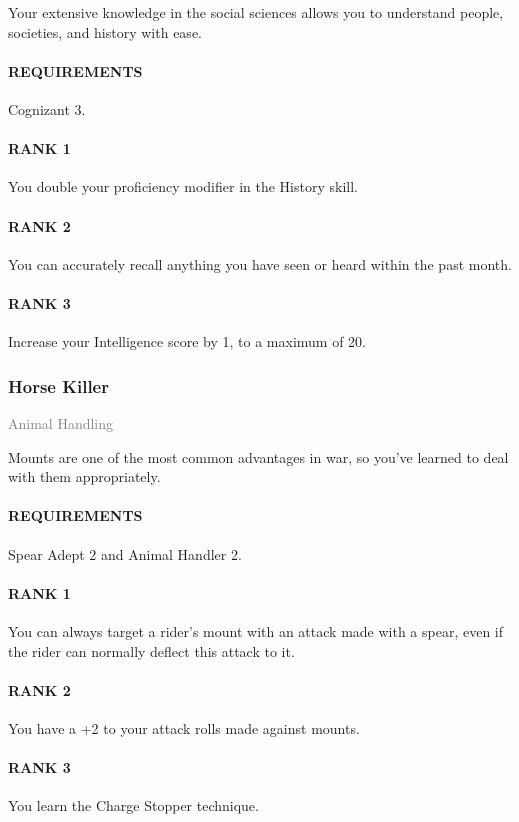 \normalsize
Your extensive knowledge in the social sciences allows you to understand people, societies, and history with ease.
\paragraph{REQUIREMENTS} Cognizant 3.
\paragraph{RANK 1} You double your proficiency modifier in the History skill.
\paragraph{RANK 2} You can accurately recall anything you have seen or heard within the past month.
\paragraph{RANK 3} Increase your Intelligence score by 1, to a maximum of 20.

\subsubsection{Horse Killer} \label{tal::horsekiller}
\small{\textcolor{gray}{Animal Handling}}

\normalsize
Mounts are one of the most common advantages in war, so you've learned to deal with them appropriately.
\paragraph{REQUIREMENTS} Spear Adept 2 and Animal Handler 2.
\paragraph{RANK 1} You can always target a rider's mount with an attack made with a spear, even if the rider can normally deflect this attack to it.
\paragraph{RANK 2} You have a +2 to your attack rolls made against mounts.
\paragraph{RANK 3} You learn the Charge Stopper technique.

